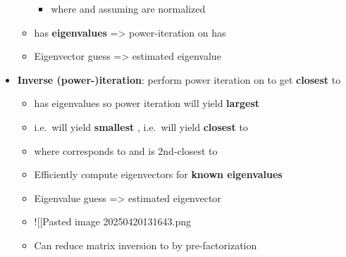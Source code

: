 \begin{itemize}
\begin{itemize}
\begin{itemize}
                  \item
                        where 
                        and assuming  are
                        normalized
                \end{itemize}
          \item
                 has \textbf{eigenvalues}
                \iMbox{\lambda-\sigma} =\textgreater{} power-iteration on
                 has
          \item
                Eigenvector guess =\textgreater{} estimated eigenvalue
        \end{itemize}
  \item
        \textbf{Inverse (power-)iteration}: perform power iteration on
         to get 
        \textbf{closest} to \iMbox{\sigma}

        \begin{itemize}

          \item
                 has eigenvalues
                 so power iteration will yield
                \textbf{largest }
          \item
                i.e.~will yield \textbf{smallest
                  }, i.e.~will yield
                 \textbf{closest} to \iMbox{\sigma}
          \item
                where  corresponds to
                 and  is
                2nd-closest to \iMbox{\sigma}
          \item
                Efficiently compute eigenvectors for \textbf{known eigenvalues}
                \iMbox{\sigma}
          \item
                Eigenvalue guess =\textgreater{} estimated eigenvector
          \item
                !{[}{[}Pasted image 20250420131643.png\textbar300{]}{]}
          \item
                Can reduce matrix inversion  to  by
                pre-factorization
        \end{itemize}
\end{itemize}

